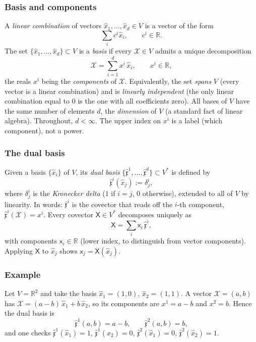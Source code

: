 \documentclass[11pt]{article}
\newcommand{\dual}{V^{*}}
\begin{document}
\subsubsection*{Basis and components}
A \emph{linear combination} of vectors $\hat x_1,\dots,\hat x_d\in V$ is a vector of the form
\[
\sum_{i}c^i\hat x_i,\qquad c^i\in\mathbb R.
\]
The set $\{\hat x_1,\dots,\hat x_d\}\subset V$ is a \emph{basis} if every $\mathcal X\in V$ admits a unique decomposition
\[
\mathcal X=\sum_{i=1}^d x^i\,\hat x_i,\qquad x^i\in\mathbb R,
\]
the reals $x^i$ being the \emph{components} of $\mathcal X$. Equivalently, the set \emph{spans} $V$ (every vector is a linear combination) and is \emph{linearly independent} (the only linear combination equal to $0$ is the one with all coefficients zero). All bases of $V$ have the same number of elements $d$, the \emph{dimension} of $V$ (a standard fact of linear algebra). Throughout, $d<\infty$. The upper index on $x^i$ is a label (which component), not a power.

\subsubsection*{The dual basis}
Given a basis $\{\hat x_i\}$ of $V$, its \emph{dual basis} $\{\hat{\mathfrak x}^1,\dots,\hat{\mathfrak x}^d\}\subset\dual$ is defined by
\[
\hat{\mathfrak x}^i(\hat x_j):=\delta^i_j,
\]
where $\delta^i_j$ is the \emph{Kronecker delta} ($1$ if $i=j$, $0$ otherwise), extended to all of $V$ by linearity. In words: $\hat{\mathfrak x}^i$ is the covector that reads off the $i$-th component, $\hat{\mathfrak x}^i(\mathcal X)=x^i$. Every covector $\mathsf X\in\dual$ decomposes uniquely as
\[
\mathsf X=\sum_i\mathsf x_i\,\hat{\mathfrak x}^i,
\]
with components $\mathsf x_i\in\mathbb R$ (lower index, to distinguish from vector components). Applying $\mathsf X$ to $\hat x_j$ shows $\mathsf x_j=\mathsf X(\hat x_j)$.

\subsubsection*{Example}
Let $V=\mathbb R^2$ and take the basis $\hat x_1=(1,0)$, $\hat x_2=(1,1)$. A vector $\mathcal X=(a,b)$ has $\mathcal X=(a-b)\,\hat x_1+b\,\hat x_2$, so its components are $x^1=a-b$ and $x^2=b$. Hence the dual basis is
\[
\hat{\mathfrak x}^1(a,b)=a-b,\qquad \hat{\mathfrak x}^2(a,b)=b,
\]
and one checks $\hat{\mathfrak x}^1(\hat x_1)=1$, $\hat{\mathfrak x}^1(\hat x_2)=0$, $\hat{\mathfrak x}^2(\hat x_1)=0$, $\hat{\mathfrak x}^2(\hat x_2)=1$.
\end{document}

